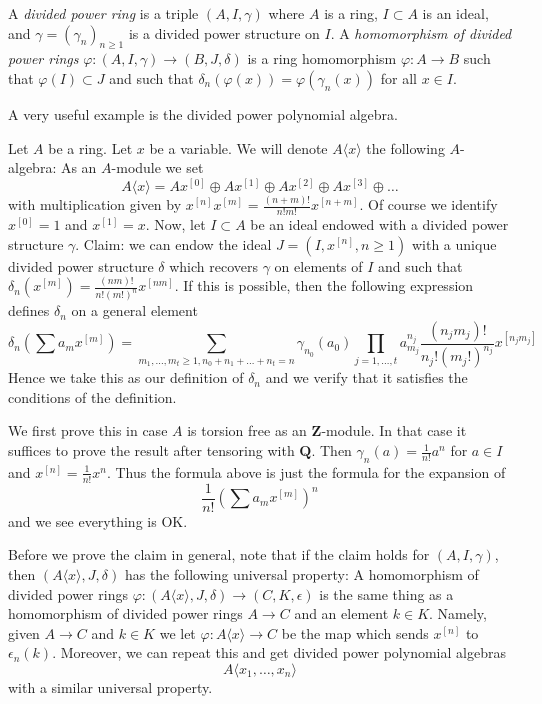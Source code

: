 \begin{definition}
\label{definition-divided-power-ring}
A {\it divided power ring} is a triple $(A, I, \gamma)$ where
$A$ is a ring, $I \subset A$ is an ideal, and $\gamma = (\gamma_n)_{n \geq 1}$
is a divided power structure on $I$.
A {\it homomorphism of divided power rings}
$\varphi : (A, I, \gamma) \to (B, J, \delta)$ is a ring homomorphism
$\varphi : A \to B$ such that $\varphi(I) \subset J$ and such that
$\delta_n(\varphi(x)) = \varphi(\gamma_n(x))$ for all $x \in I$.
\end{definition}

\noindent
A very useful example is the divided power polynomial algebra.

\begin{example}
\label{example-polynomial-algebra}
Let $A$ be a ring. Let $x$ be a variable. We will denote
$A\langle x \rangle$ the following $A$-algebra: As an
$A$-module we set
$$
A\langle x \rangle =
Ax^{[0]} \oplus Ax^{[1]} \oplus Ax^{[2]} \oplus Ax^{[3]} \oplus \ldots
$$
with multiplication given by $x^{[n]}x^{[m]} =
\frac{(n + m)!}{n!m!}x^{[n + m]}$. Of course we identify $x^{[0]} = 1$
and $x^{[1]} = x$. Now, let $I \subset A$ be an ideal endowed with a
divided power structure $\gamma$. Claim: we can endow the ideal
$J = (I, x^{[n]}, n \geq 1)$ with a unique divided power structure $\delta$
which recovers $\gamma$ on elements of $I$ and such that
$\delta_n(x^{[m]}) = \frac{(nm)!}{n!(m!)^n} x^{[nm]}$.
If this is possible, then the following expression defines $\delta_n$
on a general element
$$
\delta_n\left(\sum a_m x^{[m]}\right) =
\sum_{m_1, \ldots, m_t \geq 1, n_0 + n_1 + \ldots + n_t = n}
\gamma_{n_0}(a_0)
\prod_{j = 1, \ldots, t}
a_{m_j}^{n_j} \frac{(n_j m_j)!}{n_j!(m_j!)^{n_j}} x^{[n_jm_j]}
$$
Hence we take this as our definition of $\delta_n$ and we verify that
it satisfies the conditions of the definition.

\medskip\noindent
We first prove this in case $A$ is torsion free as an $\mathbf{Z}$-module.
In that case it suffices to prove the result after tensoring with $\mathbf{Q}$.
Then $\gamma_n(a) = \frac{1}{n!}a^n$ for $a \in I$ and
$x^{[n]} = \frac{1}{n!}x^n$. Thus the formula above is just the formula
for the expansion of
$$
\frac{1}{n!}\left(\sum a_m x^{[m]}\right)^n
$$
and we see everything is OK.

\medskip\noindent
Before we prove the claim in general, note that if the claim holds
for $(A, I, \gamma)$, then $(A\langle x \rangle, J, \delta)$ has the
following universal property: A homomorphism of divided power rings
$\varphi : (A\langle x \rangle, J, \delta) \to (C, K, \epsilon)$ is
the same thing as a homomorphism of divided power rings
$A \to C$ and an element $k \in K$. Namely, given
$A \to C$ and $k \in K$ we let $\varphi : A\langle x \rangle \to C$
be the map which sends $x^{[n]}$ to $\epsilon_n(k)$.
Moreover, we can repeat this and get divided power polynomial algebras
$$
A\langle x_1, \ldots, x_n\rangle
$$
with a similar universal property.


\end{example}
